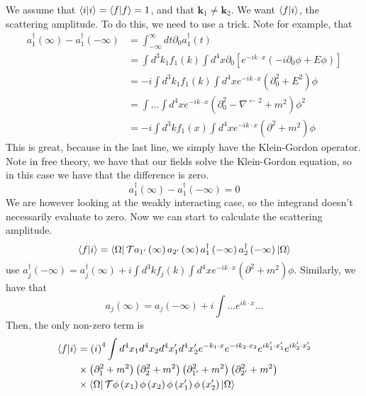 \documentclass[11pt, oneside]{article}   	%
\theoremstyle{slanted}
\let\vec\mathbf
\begin{document}
We assume that $ \bra{ i }\ket{ i }  = \bra{ f }\ket{ f }  = 1 $, 
and that $ \vec{k} _ 1 \neq \vec{k} _ 2 $. 
We want $ \bra{ f }\ket{ i }  $, the scattering  
amplitude.
To do this, we need to use a 
trick. 
Note for example, that 
\begin{align*}
	a _ 1 ^\dagger \left( \infty  \right)   - 
	a_ 1 ^\dagger \left(  - \infty  \right)  &=  \int_{ - \infty } ^{ \infty } dt 
	\partial  _ 0 a _ 1 ^\dagger \left( t  \right)  \\ 
						 &=  \int d ^ 3 k _ 1  f_ 1 \left( k  \right)  
						 \int d ^ 4 x \partial  _ 0 
						 \left[  e ^{  - i k \cdot  x } 
						 \left(  -i \partial  _ 0 \phi 
					 + E \phi \right)  \right]   \\ 
						 &=  - i \int d ^ 3 k _ 1 f _ 1 \left( k  \right)  
						 \int d ^ 4 x e ^{  -i k \cdot  x } 
						 \left(  \partial _ 0 ^ 2 
						 +  E ^ 2 \right) \phi \\ 
						 &=  \int \dots \int d ^ 4 x e ^{  -i k \cdot  x } \left( 
					 \partial  _ 0 ^ 2  - \nabla ^{ \leftarrow 2 } 
				 + m ^ 2 \right) \phi ^ 2    \\
						 &=   -i \int d ^ 3 k f _ 1 \left( x  \right)  
						 \int d ^ 4 x e ^{  -i k \cdot  x } 
						 \left( \partial  ^2 + m^ 2   \right)  
						 \phi  
\end{align*} 
This is great, because 
in the last line, we simply have the Klein-Gordon operator. 
Note in free theory, we have that 
our fields solve the Klein-Gordon equation, 
so in this case we have that the difference is zero. 
\[
	a _ 1 ^\dagger \left( \infty  \right)   - a _ 1 ^\dagger\left(  - \infty  \right)   = 0 
\]
We are however looking at the 
weakly interacting case, so the 
integrand doesn't necessarily evaluate to zero. 
Now we can start to calculate the 
scattering amplitude. 
\[
 \bra{ f }\ket{ i }  = 
 \bra{ \Omega } \mathcal{ T } a _{ 1 ' } \left( \infty  \right)  
 a _{ 2 ' } \left( \infty  \right)  a _{ 1 } ^\dagger \left( - \infty  \right)  
 a _ 2 ^\dagger \left( - \infty  \right)  \ket{ \Omega } 
\]  use $ a _ j ^\dagger \left(  - \infty   \right)  = a _ j ^\dagger \left( \infty  \right)   
+ i \int d ^ 3 k f _ j \left( k  \right)  \int d ^ 4 x e ^{  - i k \cdot   x } \left( 
\partial  ^ 2 + m ^ 2 \right)  \phi $. 
Similarly, we have that 
\[
	a _ j\left( \infty  \right)   =a _ j \left(  - \infty  \right)  
	+ i \int \dots e ^{ i k \cdot   x } \dots 
\] Then, the 
only non-zero term is 
\begin{align*}
	\bra{ f }\ket{i } & = \left( i  \right)  ^ 4 
	\int d ^ 4 x_ 1 d ^ 4 x _ 2 d ^ 4 x ' _ 1 d ^ 4 x ' _ 2 e ^{ 
	 - k_ 1 \cdot  x } e ^{  - i k _  2 \cdot  x _ 2 } e ^{ i k _ 1 ' \cdot  x _ 1 ' } 
	 e ^{ i k _ 2 ' \cdot  x _ 2 '  } \\
			  & \times \left( \partial  _ 1 ^ 2 + m ^ 2  \right)  \left( \partial  _ 2 ^ 2 
	 + m ^ 2 \right)  \left( \partial  _{ 1 ' } ^ 2 + m ^ 2  \right)  \left( 
 \partial  _{2 ' } ^ 2 + m ^ 2 \right)  \\
			  & \times \bra{\Omega } \mathcal{ T } 
			  \phi \left( x_1  \right)  \phi \left( x_2  \right)  \phi 
			  \left( x_1 '  \right)  \phi \left( x_2 '   \right) \ket{ \Omega } 
\end{align*}
\end{document}
